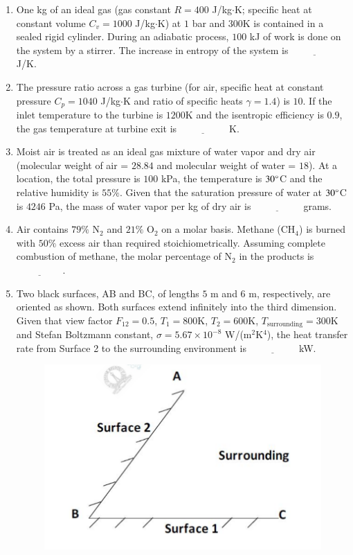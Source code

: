 \documentclass[journal]{IEEEtran}
\begin{document}
\begin{enumerate}[leftmargin=0pt]
    \item One kg of an ideal gas (gas constant $R = 400$ J/kg$\cdot$K; specific heat at constant volume $C_v = 1000$ J/kg$\cdot$K) at $1$ bar and $300$K is contained in a sealed rigid cylinder. During an adiabatic process, $100$ kJ of work is done on the system by a stirrer. The increase in entropy of the system is $\underline{\hspace{2cm}}$ J/K.
    \hfill{}

    \item The pressure ratio across a gas turbine (for air, specific heat at constant pressure $C_p = 1040$ J/kg$\cdot$K and ratio of specific heats $\gamma = 1.4$) is $10$. If the inlet temperature to the turbine is $1200$K and the isentropic efficiency is $0.9$, the gas temperature at turbine exit is $\underline{\hspace{2cm}}$ K.
    \hfill{}

    \item Moist air is treated as an ideal gas mixture of water vapor and dry air (molecular weight of air = $28.84$ and molecular weight of water = $18$). At a location, the total pressure is $100$ kPa, the temperature is $30\degree$C and the relative humidity is $55\%$. Given that the saturation pressure of water at $30\degree$C is $4246$ Pa, the mass of water vapor per kg of dry air is $\underline{\hspace{2cm}}$ grams.
    \hfill{}

    \item Air contains $79\%$ N$_2$ and $21\%$ O$_2$ on a molar basis. Methane (CH$_4$) is burned with $50\%$ excess air than required stoichiometrically. Assuming complete combustion of methane, the molar percentage of N$_2$ in the products is $\underline{\hspace{2cm}}$.
    \hfill{}

    \item Two black surfaces, AB and BC, of lengths $5$ m and $6$ m, respectively, are oriented as shown. Both surfaces extend infinitely into the third dimension. Given that view factor $F_{12} = 0.5$, $T_1 = 800$K, $T_2 = 600$K, $T_{\text{surrounding}} = 300$K and Stefan Boltzmann constant, $\sigma = 5.67 \times 10^{-8}$ W/(m$^2$K$^4$), the heat transfer rate from Surface 2 to the surrounding environment is $\underline{\hspace{2cm}}$ kW.
    \hfill{}
    \begin{figure}[h]
    \centering
    \includegraphics[width=0.5\columnwidth]{Figs/image (24).png}
    \caption*{}
    \label{fig:37}
    \end{figure}


\end{enumerate}
\end{document}
